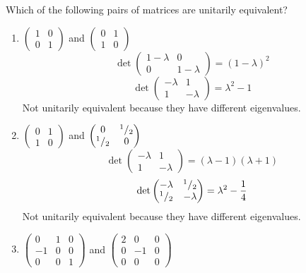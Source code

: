 Which of the following pairs of matrices are unitarily equivalent?
\begin{enumerate}
\item $\begin{pmatrix} 1& 0\\0 & 1\end{pmatrix}$ and $\begin{pmatrix}0
    &1\\1 & 0\end{pmatrix}$
\begin{equation}
\det{\begin{pmatrix} 1-\lambda& 0\\0 & 1-\lambda\end{pmatrix}} = (1-\lambda)^2
\end{equation}
\begin{equation}
\det{\begin{pmatrix}-\lambda & 1\\1 & -\lambda\end{pmatrix}} =
\lambda^2 -1
\end{equation}
Not unitarily equivalent  because they have different eigenvalues.
\item $\begin{pmatrix}0 & 1\\1 & 0 \end{pmatrix}$ and
  $\begin{pmatrix}0 & ^{1}/_{2}\\ ^{1}/_{2} & 0 \end{pmatrix}$
\begin{equation}
\det{
\begin{pmatrix}
-\lambda & 1\\
1 & -\lambda
\end{pmatrix}
} = (\lambda-1)(\lambda +1)
\end{equation}
\begin{equation}
\det{
\begin{pmatrix}
-\lambda & ^{1}/_{2}\\
^{1}/_{2} & -\lambda
\end{pmatrix}} = \lambda^2 - \frac{1}{4}
\end{equation}
Not unitarily equivalent  because they have different eigenvalues.
\item$\begin{pmatrix} 0 & 1 & 0\\-1 & 0  & 0\\0 & 0 & 1\end{pmatrix}$
  and $\begin{pmatrix} 2 & 0 & 0\\0 & -1 & 0\\ 0 & 0 & 0\end{pmatrix}$

\end{enumerate}
